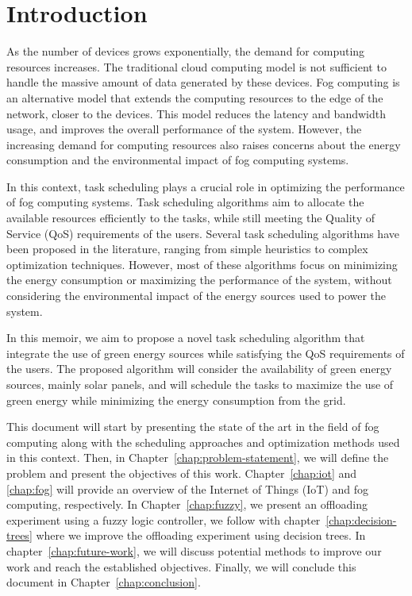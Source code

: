 \chapter{Introduction}

As the number of devices grows exponentially, the demand for computing resources increases. The traditional cloud
computing model is not sufficient to handle the massive amount of data generated by these devices. Fog computing is an
alternative model that extends the computing resources to the edge of the network, closer to the devices. This model
reduces the latency and bandwidth usage, and improves the overall performance of the system. However, the increasing
demand for computing resources also raises concerns about the energy consumption and the environmental impact of fog
computing systems.

In this context, task scheduling plays a crucial role in optimizing the performance of fog computing systems. Task
scheduling algorithms aim to allocate the available resources efficiently to the tasks, while still meeting the Quality
of Service (QoS) requirements of the users. Several task scheduling algorithms have been proposed in the literature,
ranging from simple heuristics to complex optimization techniques. However, most of these algorithms focus on
minimizing the energy consumption or maximizing the performance of the system, without considering the environmental
impact of the energy sources used to power the system.

In this memoir, we aim to propose a novel task scheduling algorithm that integrate the use of green energy sources
while satisfying the QoS requirements of the users. The proposed algorithm will consider the availability of green
energy sources, mainly solar panels, and will schedule the tasks to maximize the use of green energy while minimizing
the energy consumption from the grid.

This document will start by presenting the state of the art in the field of fog computing along with the scheduling
approaches and optimization methods used in this context. Then, in Chapter~\ref{chap:problem-statement}, we will
define the problem and present the objectives of this work. Chapter~\ref{chap:iot} and \ref{chap:fog} will provide an
overview of the Internet of Things (IoT) and fog computing, respectively. In Chapter~\ref{chap:fuzzy}, we present an
offloading experiment using a fuzzy logic controller, we follow with chapter~\ref{chap:decision-trees} where we
improve the offloading experiment using decision trees. In chapter~\ref{chap:future-work}, we will discuss potential
methods to improve our work and reach the established objectives. Finally, we will conclude this document in
Chapter~\ref{chap:conclusion}.